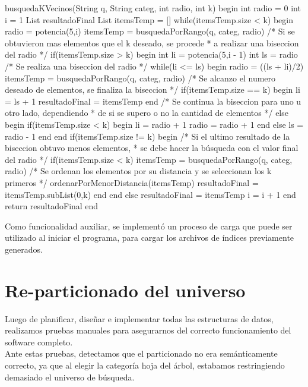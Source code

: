 \begin{algorithm}[caption={B\'usqueda de los k-vecinos}, label={alg5}]
busquedaKVecinos(String q, String categ, int radio, int k)
begin
 int radio = 0
 int i = 1
 List resultadoFinal
 List itemsTemp = []
 while(itemsTemp.size < k)
 begin
  radio = potencia(5,i)
  itemsTemp = busquedaPorRango(q, categ, radio)
  /* Si se obtuvieron mas elementos que el k deseado, se procede 
   * a realizar una biseccion del radio */
  if(itemsTemp.size > k)
  begin
   int li = potencia(5,i - 1)
   int ls = radio
   /* Se realiza una biseccion del radio */
   while(li <= ls)
   begin
    radio = ((ls + li)/2)
    itemsTemp = busquedaPorRango(q, categ, radio)
    /* Se alcanzo el numero deseado de elementos, se finaliza la biseccion */
    if(itemsTemp.size == k)
    begin
     li = ls + 1
     resultadoFinal = itemsTemp
    end
    /* Se continua la biseccion para uno u otro lado, dependiendo 
     * de si se supero o no la cantidad de elementos */
    else
    begin
     if(itemsTemp.size < k)
     begin
      li = radio + 1
      radio = radio + 1
     end
     else
      ls = radio - 1
    end
   end
   if(itemsTemp.size != k)
   begin
    /* Si el ultimo resultado de la biseccion obtuvo menos elementos,
     * se debe hacer la b\'usqueda con el valor final del radio */
    if(itemsTemp.size < k)
     itemsTemp = busquedaPorRango(q, categ, radio)
    /* Se ordenan los elementos por su distancia y se seleccionan los k primeros */
    ordenarPorMenorDistancia(itemsTemp)
    resultadoFinal = itemsTemp.subList(0,k)
   end
  end
  else
   resultadoFinal = itemsTemp
  i = i + 1 
 end
 return resultadoFinal
end
\end{algorithm}

Como funcionalidad auxiliar, se implement\'o un proceso de carga que puede ser utilizado al iniciar el programa, para cargar los archivos de \'indices previamente generados.


\section{Re-particionado del universo}

Luego de planificar, diseñar e implementar todas las estructuras de datos, realizamos pruebas manuales para asegurarnos del correcto funcionamiento del software completo.\\

Ante estas pruebas, detectamos que el particionado no era sem\'anticamente correcto, ya que al elegir la categor\'ia hoja del \'arbol, estabamos restringiendo demasiado el universo de b\'usqueda.\\

